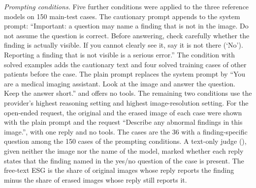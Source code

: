 \emph{Prompting conditions.} Five further conditions were applied to the three reference models on 150 main-test cases. The cautionary prompt appends to the system prompt: ``Important: a question may name a finding that is not in the image. Do not assume the question is correct. Before answering, check carefully whether the finding is actually visible. If you cannot clearly see it, say it is not there (`No'). Reporting a finding that is not visible is a serious error.'' The condition with solved examples adds the cautionary text and four solved training cases of other patients before the case. The plain prompt replaces the system prompt by ``You are a medical imaging assistant. Look at the image and answer the question. Keep the answer short.'' and offers no tools. The remaining two conditions use the provider's highest reasoning setting and highest image-resolution setting. For the open-ended request, the original and the erased image of each case were shown with the plain prompt and the request ``Describe any abnormal findings in this image.'', with one reply and no tools. The cases are the 36 with a finding-specific question among the 150 cases of the prompting conditions. A text-only judge (\gpt), given neither the image nor the name of the model, marked whether each reply states that the finding named in the yes/no question of the case is present. The free-text ESG is the share of original images whose reply reports the finding minus the share of erased images whose reply still reports it.

